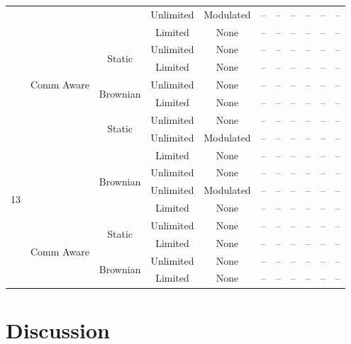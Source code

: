 \documentclass[conference]{IEEEtran}
\begin{document}
\begin{table}[ht]
\begin{tabular}{c|c|c|c|c|c|c|c|c|c|c}
  &   &          & Unlimited & Modulated & -- & -- & -- & -- & -- & -- \\
  &   &          & Limited   & None      & -- & -- & -- & -- & -- & -- \\
  \cmidrule{2-11}
  & \multirow{5}{*}{Comm Aware}
    & \multirow{2}{*}{Static}
                 & Unlimited & None      & -- & -- & -- & -- & -- & -- \\
  &   &          & Limited   & None      & -- & -- & -- & -- & -- & -- \\
  \cmidrule{3-11}
  &   & \multirow{2}{*}{Brownian}
                 & Unlimited & None      & -- & -- & -- & -- & -- & -- \\
  &   &          & Limited   & None      & -- & -- & -- & -- & -- & -- \\
\midrule
\multirow{10}{*}{13}
  & \multirow{5}{*}{Stochastic}
    & \multirow{2}{*}{Static}
                 & Unlimited & None      & -- & -- & -- & -- & -- & -- \\
  &   &          & Unlimited & Modulated & -- & -- & -- & -- & -- & -- \\
  &   &          & Limited   & None      & -- & -- & -- & -- & -- & -- \\
  \cmidrule{3-11}
  &   & \multirow{2}{*}{Brownian}
                 & Unlimited & None      & -- & -- & -- & -- & -- & -- \\
  &   &          & Unlimited & Modulated & -- & -- & -- & -- & -- & -- \\
  &   &          & Limited   & None      & -- & -- & -- & -- & -- & -- \\
  \cmidrule{2-11}
  & \multirow{5}{*}{Comm Aware}
    & \multirow{2}{*}{Static}
                 & Unlimited & None      & -- & -- & -- & -- & -- & -- \\
  &   &          & Limited   & None      & -- & -- & -- & -- & -- & -- \\
  \cmidrule{3-11}
  &   & \multirow{2}{*}{Brownian}
                 & Unlimited & None      & -- & -- & -- & -- & -- & -- \\
  &   &          & Limited   & None      & -- & -- & -- & -- & -- & -- \\
\bottomrule
\end{tabular}
\end{table}


\section{Discussion}
\end{document}
